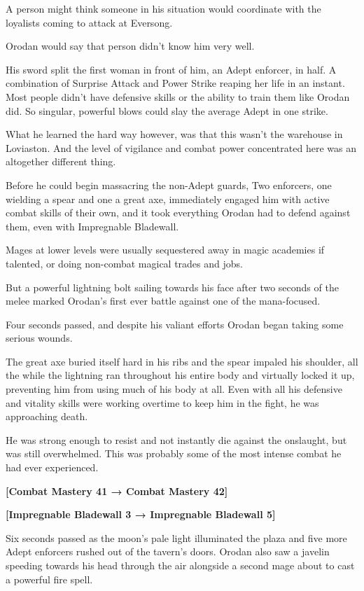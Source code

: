 \documentclass[a4paper,10pt]{book}
\begin{document}
A person might think someone in his situation would coordinate with the loyalists coming to attack at Eversong.\par
Orodan would say that person didn’t know him very well.\par
His sword split the first woman in front of him, an Adept enforcer, in half. A combination of Surprise Attack and Power Strike reaping her life in an instant. Most people didn’t have defensive skills or the ability to train them like Orodan did. So singular, powerful blows could slay the average Adept in one strike.\par
What he learned the hard way however, was that this wasn’t the warehouse in Loviaston. And the level of vigilance and combat power concentrated here was an altogether different thing.\par
Before he could begin massacring the non-Adept guards, Two enforcers, one wielding a spear and one a great axe, immediately engaged him with active combat skills of their own, and it took everything Orodan had to defend against them, even with Impregnable Bladewall.\par
Mages at lower levels were usually sequestered away in magic academies if talented, or doing non-combat magical trades and jobs.\par
But a powerful lightning bolt sailing towards his face after two seconds of the melee marked Orodan’s first ever battle against one of the mana-focused.\par
Four seconds passed, and despite his valiant efforts Orodan began taking some serious wounds.\par
The great axe buried itself hard in his ribs and the spear impaled his shoulder, all the while the lightning ran throughout his entire body and virtually locked it up, preventing him from using much of his body at all. Even with all his defensive and vitality skills were working overtime to keep him in the fight, he was approaching death.\par
He was strong enough to resist and not instantly die against the onslaught, but was still overwhelmed. This was probably some of the most intense combat he had ever experienced.\par
\textbf{[Combat Mastery 41 → Combat Mastery 42]}\par
\textbf{[Impregnable Bladewall 3 → Impregnable Bladewall 5]}\par
Six seconds passed as the moon’s pale light illuminated the plaza and five more Adept enforcers rushed out of the tavern’s doors. Orodan also saw a javelin speeding towards his head through the air alongside a second mage about to cast a powerful fire spell.\par
\end{document}
